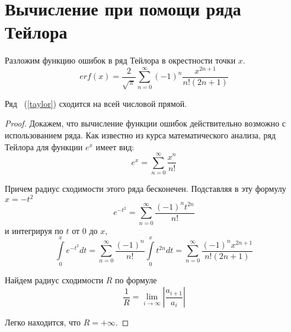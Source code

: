 \section{Вычисление при помощи ряда Тейлора} Разложим функцию ошибок в ряд Тейлора в окрестности точки $x$.
\begin{equation}
	\label{taylor}
	erf(x) = \frac{2}{\sqrt{\pi}}\sum^{\infty}_{n = 0}(-1)^n \frac{x^{2n+1}}{n!(2n+1)}
\end{equation}
\begin{theorem}
	Ряд ~(\ref{taylor}) сходится на всей числовой прямой.
\end{theorem}
\begin{proof}
	Докажем, что вычисление функции ошибок действительно возможно с использованием ряда. Как известно из курса математического анализа, ряд Тейлора для функции $e^x$ имеет вид:
	$$
		e^x = \sum\limits_{n=0}^{\infty} \frac{x^n}{n!}
	$$
	
	Причем радиус сходимости этого ряда бесконечен. Подставляя в эту формулу $x = -t^2$
	$$
		e^{-t^2} = \sum\limits_{n=0}^{\infty} \frac{(-1)^nt^{2n}}{n!}
	$$
	и интегрируя по $t$ от $0$ до $x$,
	$$
		\int\limits_{0}^{x} e^{-t^2} dt= \sum\limits_{n=0}^{\infty} \frac{(-1)^n}{n!}\int\limits_{0}^{x} t^{2n} dt = \sum\limits_{n=0}^{\infty} \frac{(-1)^nx^{2n+1}}{n!(2n+1)}
	$$
	
	Найдем радиус сходимости $R$ по формуле
	$$
		\frac{1}{R} = \lim\limits_{i \to \infty} \left| \frac{a_{i+1}}{a_i} \right|
	$$
	
	Легко находится, что $R = +\infty$.
\end{proof}
